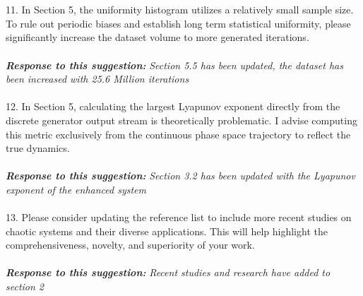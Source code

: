 \documentclass{report}
\begin{document}
\\
\\
11. In Section 5, the uniformity histogram utilizes a relatively small sample size. To rule
out periodic biases and establish long term statistical uniformity, please significantly
increase the dataset volume to more generated iterations.
\\
\\
\textbf{\textit{Response to this suggestion:}}
\textit{Section 5.5 has been updated, the dataset has been increased with 25.6 Million iterations}
\\
\\
12. In Section 5, calculating the largest Lyapunov exponent directly from the discrete
generator output stream is theoretically problematic. I advise computing this metric
exclusively from the continuous phase space trajectory to reflect the true dynamics.
\\
\\
\textbf{\textit{Response to this suggestion:}}
\textit{Section 3.2 has been updated with the Lyapunov exponent of the enhanced system}
\\
\\
13. Please consider updating the reference list to include more recent studies on chaotic
systems and their diverse applications. This will help highlight the comprehensiveness,
novelty, and superiority of your work.
\\
\\
\textbf{\textit{Response to this suggestion:}}
\textit{Recent studies and research have added to section 2}
\\
\\
\end{document}

